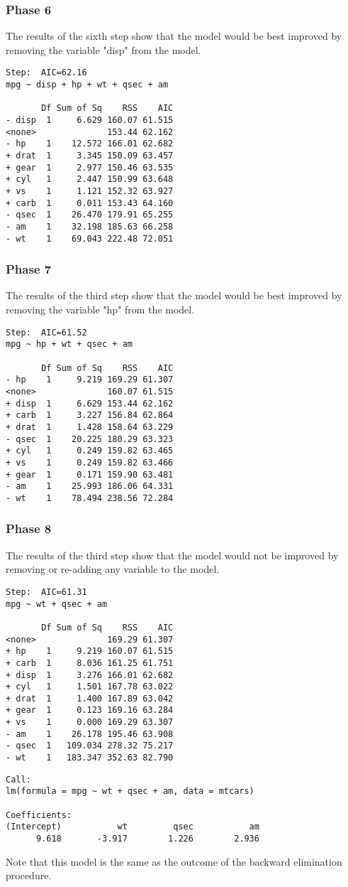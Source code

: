 \documentclass[a4paper,12pt]{article}
\begin{document}
\subsubsection{Phase 6}
The results of the sixth step show that the model would be best improved by removing the variable "disp" from the model.
\footnotesize
\begin{verbatim}
Step:  AIC=62.16
mpg ~ disp + hp + wt + qsec + am

       Df Sum of Sq    RSS    AIC
- disp  1     6.629 160.07 61.515
<none>              153.44 62.162
- hp    1    12.572 166.01 62.682
+ drat  1     3.345 150.09 63.457
+ gear  1     2.977 150.46 63.535
+ cyl   1     2.447 150.99 63.648
+ vs    1     1.121 152.32 63.927
+ carb  1     0.011 153.43 64.160
- qsec  1    26.470 179.91 65.255
- am    1    32.198 185.63 66.258
- wt    1    69.043 222.48 72.051
\end{verbatim}
\normalsize
\newpage
\subsubsection{Phase 7}
The results of the third step show that the model would be best improved by removing the variable "hp" from the model.
\footnotesize
\begin{verbatim}
Step:  AIC=61.52
mpg ~ hp + wt + qsec + am

       Df Sum of Sq    RSS    AIC
- hp    1     9.219 169.29 61.307
<none>              160.07 61.515
+ disp  1     6.629 153.44 62.162
+ carb  1     3.227 156.84 62.864
+ drat  1     1.428 158.64 63.229
- qsec  1    20.225 180.29 63.323
+ cyl   1     0.249 159.82 63.465
+ vs    1     0.249 159.82 63.466
+ gear  1     0.171 159.90 63.481
- am    1    25.993 186.06 64.331
- wt    1    78.494 238.56 72.284
\end{verbatim}
\normalsize
\subsubsection{Phase 8}
The results of the third step show that the model would not be improved by removing or re-adding any variable to the model.
\footnotesize
\begin{verbatim}
Step:  AIC=61.31
mpg ~ wt + qsec + am

       Df Sum of Sq    RSS    AIC
<none>              169.29 61.307
+ hp    1     9.219 160.07 61.515
+ carb  1     8.036 161.25 61.751
+ disp  1     3.276 166.01 62.682
+ cyl   1     1.501 167.78 63.022
+ drat  1     1.400 167.89 63.042
+ gear  1     0.123 169.16 63.284
+ vs    1     0.000 169.29 63.307
- am    1    26.178 195.46 63.908
- qsec  1   109.034 278.32 75.217
- wt    1   183.347 352.63 82.790
\end{verbatim}
\normalsize
\footnotesize
\begin{verbatim}
Call:
lm(formula = mpg ~ wt + qsec + am, data = mtcars)

Coefficients:
(Intercept)           wt         qsec           am
      9.618       -3.917        1.226        2.936
\end{verbatim}
\normalsize
Note that this model is the same as the outcome of the backward elimination procedure.
\end{document}
